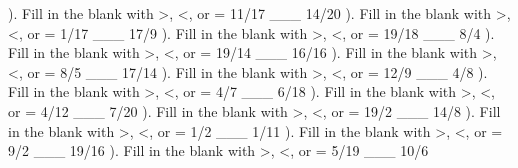 \documentclass{article}%
\begin{document}
\newline%
\newline%
). Fill in the blank with >, <, or = 11/17 \_\_\_ 14/20%
\newline%
\newline%
). Fill in the blank with >, <, or = 1/17 \_\_\_ 17/9%
\newline%
\newline%
). Fill in the blank with >, <, or = 19/18 \_\_\_ 8/4%
\newline%
\newline%
). Fill in the blank with >, <, or = 19/14 \_\_\_ 16/16%
\newline%
\newline%
). Fill in the blank with >, <, or = 8/5 \_\_\_ 17/14%
\newline%
\newline%
). Fill in the blank with >, <, or = 12/9 \_\_\_ 4/8%
\newline%
\newline%
). Fill in the blank with >, <, or = 4/7 \_\_\_ 6/18%
\newline%
\newline%
). Fill in the blank with >, <, or = 4/12 \_\_\_ 7/20%
\newline%
\newline%
). Fill in the blank with >, <, or = 19/2 \_\_\_ 14/8%
\newline%
\newline%
). Fill in the blank with >, <, or = 1/2 \_\_\_ 1/11%
\newline%
\newline%
). Fill in the blank with >, <, or = 9/2 \_\_\_ 19/16%
\newline%
\newline%
). Fill in the blank with >, <, or = 5/19 \_\_\_ 10/6%
\newline%
\newline%
\newline%
\end{document}
